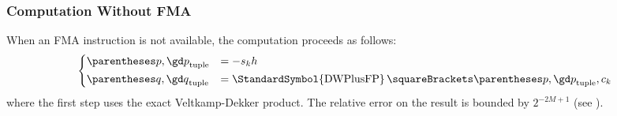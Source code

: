 \documentclass[10pt, a4paper, twoside]{basestyle}
\DeclareMathOperator{\dwplusfp}{\StandardSymbol{DWPlusFP}}
\begin{document}
\subsubsection*{Computation Without FMA}

When an FMA instruction is not available, the computation proceeds as follows:
\[
\begin{dcases}
\tuple{p, \gd p} &= -s_k h \\
\tuple{q, \gd q} &= \dwplusfp\of{\tuple{p, \gd p}, c_k}
\end{dcases}
\]
where the first step uses the exact Veltkamp-Dekker product.  The relative error on the result is bounded by $2^{-2 M + 1}$ (see \cite{MullerRideau2022}).
\end{document}
